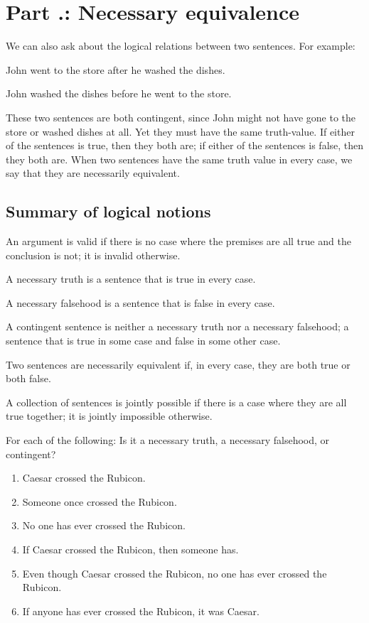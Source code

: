 \section{Part \thechapcount.\theseccount: Necessary equivalence}
We can also ask about the logical relations between two sentences. For example:
\begin{earg}
\item[]John went to the store after he washed the dishes.
\item[]John washed the dishes before he went to the store.
\end{earg}
These two sentences are both contingent, since John might not have gone to the store or washed dishes at all. Yet they must have the same truth-value. If either of the sentences is true, then they both are; if either of the sentences is false, then they both are. When two sentences have the same truth value in every case, we say that they are necessarily equivalent.
\subsection{Summary of logical notions}
\begin{ebullet}
\item[\textbullet] An argument is valid if there is no case where the premises are all true and the conclusion is not; it is invalid otherwise.
\item[\textbullet] A necessary truth is a sentence that is true in every case.
\item[\textbullet] A necessary falsehood is a sentence that is false in every case.
\item[\textbullet] A contingent sentence is neither a necessary truth nor a necessary falsehood; a sentence that is true in some case and false in some other case.
\item[\textbullet] Two sentences are necessarily equivalent if, in every case, they are both true or both false.
\item[\textbullet] A collection of sentences is jointly possible if there is a case where they are all true together; it is jointly impossible otherwise.
\end{ebullet}

\practiceproblems
\problempart
\label{pr.EnglishTautology2}
For each of the following: Is it a necessary truth, a necessary falsehood, or contingent?
\begin{enumerate}
\item Caesar crossed the Rubicon.
\item Someone once crossed the Rubicon.
\item No one has ever crossed the Rubicon.
\item If Caesar crossed the Rubicon, then someone has.
\item Even though Caesar crossed the Rubicon, no one has ever crossed the Rubicon.
\item If anyone has ever crossed the Rubicon, it was Caesar.
\end{enumerate}

